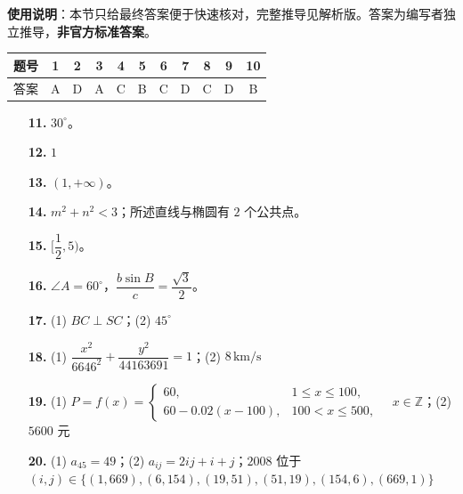 
\begin{gknotice}
\textbf{使用说明}：本节只给最终答案便于快速核对，完整推导见解析版。答案为编写者独立推导，\textbf{非官方标准答案}。
\end{gknotice}

\begin{center}\begin{tabular}{ccccccccccc}
\toprule
题号 & 1 & 2 & 3 & 4 & 5 & 6 & 7 & 8 & 9 & 10 \\
\midrule
答案 & A & D & A & C & B & C & D & C & D & B \\
\bottomrule
\end{tabular}\end{center}

\begin{itemize}[leftmargin=2.6em]
  \item[\textbf{11.}] $30^\circ$。
  \item[\textbf{12.}] $1$
  \item[\textbf{13.}] $(1,+\infty)$。
  \item[\textbf{14.}] $m^2+n^2<3$；所述直线与椭圆有 $2$ 个公共点。
\end{itemize}

\begin{itemize}[leftmargin=2.6em]
  \item[\textbf{15.}] $[\dfrac12,5)$。
  \item[\textbf{16.}] $\angle A=60^\circ$，$\dfrac{b\sin B}{c}=\dfrac{\sqrt3}{2}$。
  \item[\textbf{17.}] (1) $BC\perp SC$；(2) $45^\circ$
  \item[\textbf{18.}] (1) $\dfrac{x^2}{6646^2}+\dfrac{y^2}{44163691}=1$；(2) $8\,\text{km/s}$
  \item[\textbf{19.}] (1) $P=f(x)=\begin{cases}60,&1\le x\le100,\\60-0.02(x-100),&100<x\le500,\end{cases}\quad x\in\mathbb Z$；(2) $5600$ 元
  \item[\textbf{20.}] (1) $a_{45}=49$；(2) $a_{ij}=2ij+i+j$；$2008$ 位于 $(i,j)\in\{(1,669),(6,154),(19,51),(51,19),(154,6),(669,1)\}$
\end{itemize}
